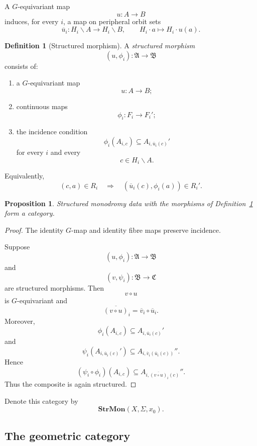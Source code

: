 \documentclass[11pt]{article}
\theoremstyle{plain}
\newtheorem{proposition}[theorem]{Proposition}
\theoremstyle{definition}
\newtheorem{definition}[theorem]{Definition}
\begin{document}
A $G$-equivariant map
\[
u:A\longrightarrow B
\]
induces, for every $i$, a map on peripheral orbit sets
\[
\overline u_i:
H_i\backslash A
\longrightarrow
H_i\backslash B,
\qquad
H_i\cdot a
\longmapsto
H_i\cdot u(a).
\]

\begin{definition}[Structured morphism]
\label{def:structured-morphism}
A \emph{structured morphism}
\[
(u,\phi_i):
\mathfrak A\longrightarrow\mathfrak B
\]
consists of:
\begin{enumerate}[label=(\roman*)]
\item a $G$-equivariant map
\[
u:A\to B;
\]
\item continuous maps
\[
\phi_i:F_i\to F_i';
\]
\item the incidence condition
\[
\phi_i(A_{i,c})
\subseteq
A_{i,\overline u_i(c)}'
\]
for every $i$ and every
\[
c\in H_i\backslash A.
\]
\end{enumerate}
\end{definition}

Equivalently,
\[
(c,a)\in R_i
\quad\Longrightarrow\quad
(\overline u_i(c),\phi_i(a))\in R_i'.
\]

\begin{proposition}
\label{prop:structured-category}
Structured monodromy data with the morphisms of
Definition~\ref{def:structured-morphism} form a category.
\end{proposition}

\begin{proof}
The identity $G$-map and identity fibre maps preserve incidence.

Suppose
\[
(u,\phi_i):
\mathfrak A\to\mathfrak B
\]
and
\[
(v,\psi_i):
\mathfrak B\to\mathfrak C
\]
are structured morphisms.  Then
\[
v\circ u
\]
is $G$-equivariant and
\[
\overline{(v\circ u)}_i
=
\overline v_i\circ\overline u_i.
\]
Moreover,
\[
\phi_i(A_{i,c})
\subseteq
A_{i,\overline u_i(c)}'
\]
and
\[
\psi_i
\left(
A_{i,\overline u_i(c)}'
\right)
\subseteq
A_{i,\overline v_i(\overline u_i(c))}''.
\]
Hence
\[
(\psi_i\circ\phi_i)(A_{i,c})
\subseteq
A_{i,\overline{(v\circ u)}_i(c)}''.
\]
Thus the composite is again structured.
\end{proof}

Denote this category by
\[
\mathbf{StrMon}(X,\Sigma,x_0).
\]

\subsection{The geometric category}
\label{subsec:geometric-incidence-category}
\end{document}
